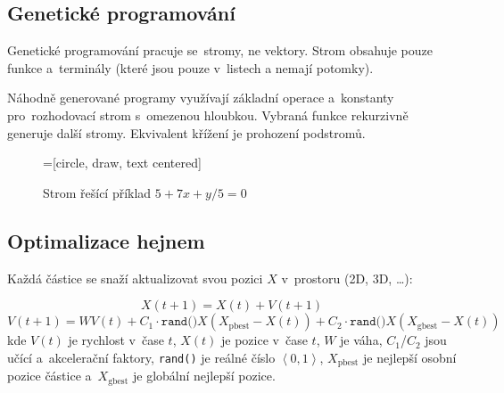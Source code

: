 \subsection{Genetické programování}

Genetické programování pracuje se~stromy, ne vektory.
Strom obsahuje pouze funkce a~terminály (které jsou pouze v~listech a nemají potomky).

Náhodně generované programy využívají základní operace a~konstanty pro~rozhodovací strom s~omezenou hloubkou.
Vybraná funkce rekurzivně generuje další stromy.
Ekvivalent křížení je prohození podstromů.

\begin{figure}[ht]
    \centering
    =[circle, draw, text centered]
    \caption{Strom řešící příklad $5 + 7x + y/5 = 0$}
\end{figure}
\FloatBarrier

\subsection{Optimalizace hejnem}

Každá částice se snaží aktualizovat svou pozici $X$ v~prostoru (2D, 3D, \dots):

$$X(t+1) = X(t) + V(t+1)$$
$$V(t+1) = WV(t) + C_1 \cdot \mathrm{\texttt{rand()}} X (X_\mathrm{pbest} - X(t)) + C_2 \cdot \mathrm{\texttt{rand()}} X (X_\mathrm{gbest} - X(t))$$
%
kde $V(t)$ je rychlost v~čase $t$, $X(t)$ je pozice v~čase $t$, $W$ je váha, $C_1$/$C_2$ jsou učící a~akcelerační faktory, \texttt{rand()} je reálné číslo $\left<0, 1\right>$, $X_\mathrm{pbest}$ je nejlepší osobní pozice částice a~$X_\mathrm{gbest}$ je globální nejlepší pozice.

